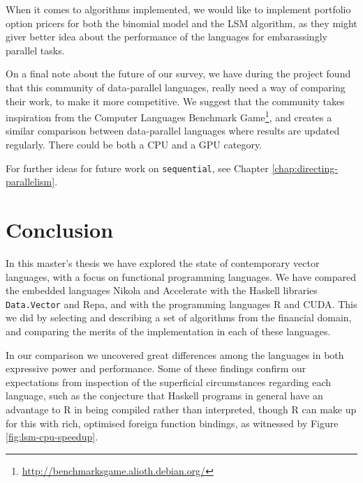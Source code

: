 When it comes to algorithms implemented, we would like to implement
portfolio option pricers for both the binomial model and the LSM
algorithm, as they might giver better idea about the performance of
the languages for embarassingly parallel tasks.

On a final note about the future of our survey, we have during the
project found that this community of data-parallel languages, really
need a way of comparing their work, to make it more competitive. We
suggest that the community takes inspiration from the Computer
Languages Benchmark
Game\footnote{\url{http://benchmarksgame.alioth.debian.org/}}, and
creates a similar comparison between data-parallel languages where
results are updated regularly. There could be both a CPU and a GPU
category.

For further ideas for future work on \lstinline{sequential}, see
Chapter \ref{chap:directing-parallelism}.



\section{Conclusion}
\label{sec:conclusion}

In this master's thesis we have explored the state of contemporary vector
languages, with a focus on functional programming languages. We have compared
the embedded languages Nikola and Accelerate with the Haskell libraries
\lstinline{Data.Vector} and Repa, and with the programming languages R and
CUDA.  This we did by selecting and describing a set of algorithms from the
financial domain, and comparing the merits of the implementation in each of
these languages.

In our comparison we uncovered great differences among the languages in both
expressive power and performance. Some of these findings confirm our
expectations from inspection of the superficial circumstances regarding each
language, such as the conjecture that Haskell programs in general have an
advantage to R in being compiled rather than interpreted, though R can make up
for this with rich, optimised foreign function bindings, as witnessed by Figure
\ref{fig:lsm-cpu-speedup}.

